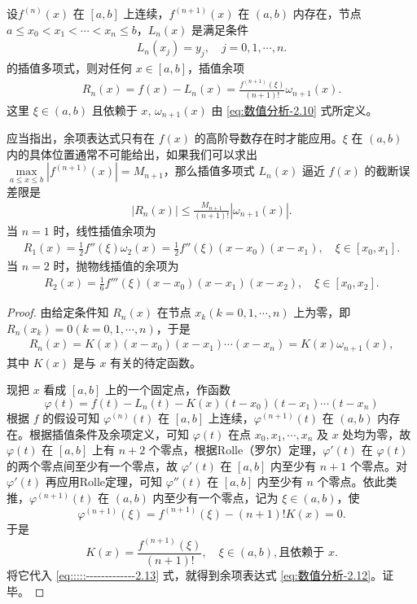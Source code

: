 \documentclass[../../main.tex]{subfiles}
\begin{document}
\begin{theorem}\label{theorem:Lagrange插值多项式的Lagrange插值余项}
设$f^{(n)}(x)$ 在 $[a, b]$ 上连续，$f^{(n + 1)}(x)$ 在 $(a, b)$ 内存在，节点 $a \leqslant x_0 < x_1 < \cdots < x_n \leqslant b$，$L_n(x)$ 是满足条件 
\begin{align*}
L_n(x_j) = y_j, \quad j = 0, 1, \cdots, n.
\end{align*}
的插值多项式，则对任何 $x \in [a, b]$，插值余项 
\begin{align}
R_n(x) = f(x) - L_n(x) = \frac{f^{(n + 1)}(\xi)}{(n + 1)!} \omega_{n + 1}(x). \label{eq:数值分析-2.12}
\end{align}
这里 $\xi \in (a, b)$ 且依赖于 $x$,$\,\,\omega_{n + 1}(x)$ 由 \eqref{eq:数值分析-2.10} 式所定义。
\end{theorem}
\begin{remark}
应当指出，余项表达式只有在 $f(x)$ 的高阶导数存在时才能应用。$\xi$ 在 $(a, b)$ 内的具体位置通常不可能给出，如果我们可以求出 $\max\limits_{a \leqslant x \leqslant b} | f^{(n + 1)}(x) | = M_{n + 1}$，那么插值多项式 $L_n(x)$ 逼近 $f(x)$ 的截断误差限是
\begin{align}
| R_n(x) | \leqslant \frac{M_{n + 1}}{(n + 1)!} | \omega_{n + 1}(x) | .\label{eq:数值分析-2.14}
\end{align}
当 $n = 1$ 时，线性插值余项为 
\begin{align}
R_1(x) = \frac{1}{2} f''(\xi) \omega_2(x) = \frac{1}{2} f''(\xi)(x - x_0)(x - x_1), \quad \xi \in [x_0, x_1] .\label{eq:数值分析-2.15}
\end{align}
当 $n = 2$ 时，抛物线插值的余项为 
\begin{align}
R_2(x) = \frac{1}{6} f'''(\xi)(x - x_0)(x - x_1)(x - x_2), \quad \xi \in [x_0, x_2].\label{eq:数值分析-2.16}
\end{align}
\end{remark}
\begin{proof}
由给定条件知 $R_n(x)$ 在节点 $x_k (k = 0, 1, \cdots, n)$ 上为零，即 $R_n(x_k) = 0 (k = 0, 1, \cdots, n)$，于是 
\begin{align}
R_n(x) = K(x)(x - x_0)(x - x_1) \cdots (x - x_n) = K(x) \omega_{n + 1}(x),\label{eq:::::-------------2.13}
\end{align}
其中 $K(x)$ 是与 $x$ 有关的待定函数。

现把 $x$ 看成 $[a, b]$ 上的一个固定点，作函数 
\[
\varphi(t) = f(t) - L_n(t) - K(x)(t - x_0)(t - x_1) \cdots (t - x_n)
\]
根据 $f$ 的假设可知 $\varphi^{(n)}(t)$ 在 $[a, b]$ 上连续，$\varphi^{(n + 1)}(t)$ 在 $(a, b)$ 内存在。根据插值条件及余项定义，可知 $\varphi(t)$ 在点 $x_0, x_1, \cdots, x_n$ 及 $x$ 处均为零，故 $\varphi(t)$ 在 $[a, b]$ 上有 $n + 2$ 个零点，根据Rolle（罗尔）定理，$\varphi'(t)$ 在 $\varphi(t)$ 的两个零点间至少有一个零点，故 $\varphi'(t)$ 在 $[a, b]$ 内至少有 $n + 1$ 个零点。对 $\varphi'(t)$ 再应用Rolle定理，可知 $\varphi''(t)$ 在 $[a, b]$ 内至少有 $n$ 个零点。依此类推，$\varphi^{(n + 1)}(t)$ 在 $(a, b)$ 内至少有一个零点，记为 $\xi \in (a, b)$，使 
\[
\varphi^{(n + 1)}(\xi) = f^{(n + 1)}(\xi) - (n + 1)! K(x) = 0.
\]
于是 
\[
K(x) = \frac{f^{(n + 1)}(\xi)}{(n + 1)!}, \quad \xi \in (a, b), \text{且依赖于 } x.
\]
将它代入 \eqref{eq:::::-------------2.13} 式，就得到余项表达式 \eqref{eq:数值分析-2.12}。证毕。
\end{proof}
\end{document}
